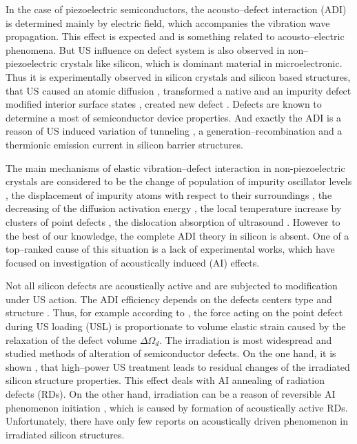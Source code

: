\documentclass[aip,jap, amsmath,amssymb,reprint]{revtex4-1}
\begin{document}
In the case of piezoelectric semiconductors, the acousto--defect interaction (ADI) is determined mainly by electric field, which accompanies the vibration wave propagation.
This effect is expected and is something related to acousto--electric phenomena.
But US influence on defect system is also observed in non--piezoelectric crystals like silicon, which is dominant material in microelectronic.
Thus it is experimentally observed in silicon crystals and silicon based structures, that US
caused an atomic diffusion \cite{Roman:2010JAP,Roman:2007APL},
transformed a native and an impurity defect \cite{Ostapenko1994,Korotchenkov1995,Olikh2009Sem,Ostapenko1995,Ostrovskii2001}
modified  interior surface states \cite{Medvids,Zaver:2008,Mirsagatov},
created new defect \cite{Savkina2015,Virot}.
Defects are known to determine a most of semiconductor device properties.
And exactly the ADI is a reason of US induced variation of tunneling \cite{Olikh2016JSem,Olikh2011Sem}, a generation--recombination \cite{Davletova2009,Davletova2008,YOlikh2005} and  a thermionic emission \cite{OlikhJAP,Olikh:Ultras} current in silicon barrier structures.

The main mechanisms of elastic vibration--defect interaction in non-piezoelectric crystals are considered to be
the  change  of  population  of  impurity  oscillator  levels  \cite{Pavlovich},
the displacement of impurity atoms with respect to their surroundings \cite{Korotchenkov1995,MirzadeJAP2011,PeleshchakUJF2016},
the decreasing of the diffusion activation  energy \cite{Krevchik},
the local temperature increase by clusters of point defects \cite{MirzadeJAP2005},
the dislocation absorption of ultrasound \cite{Davletova2008,OstrovKor92,Olikh:Ultras2016}.
However to the best of our knowledge, the complete ADI theory in silicon is absent.
One of a top--ranked cause of  this situation is a lack of experimental works, which have focused on investigation of acoustically induced (AI) effects.

Not all silicon defects are acoustically active and are subjected to modification under US action.
The ADI efficiency depends on the defects centers type and structure \cite{Medvids}.
Thus, for example according to \cite{MirzadeJAP2011,PeleshchakUJF2016}, the force acting on the point defect during US loading (USL) is proportionate to volume elastic strain caused by the relaxation of the defect volume $\Delta\Omega_d$.
The irradiation is most widespread and studied methods of alteration of semiconductor defects.
On the one hand, it is shown \cite{YOlikh2007TPL,Parchinskii2006,Gorb2010,Podolian2012}, that high--power US treatment leads to residual changes of the irradiated silicon structure properties.
This effect deals with AI annealing of radiation defects (RDs).
On the other hand, irradiation can be a reason of reversible AI phenomenon initiation \cite{YOlikh2006TPL,YOlikhTPL2011}, which is caused by formation of acoustically active RDs.
Unfortunately, there have only few reports on acoustically driven phenomenon in irradiated silicon structures.
\end{document}

